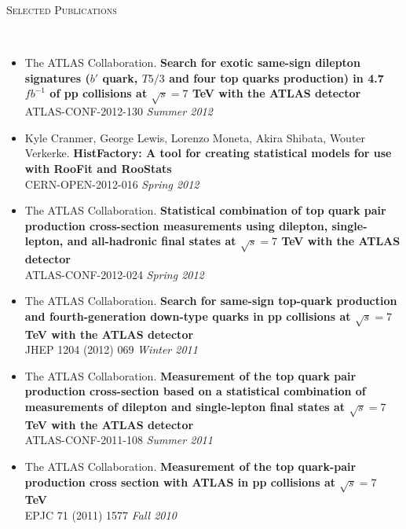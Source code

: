 \documentclass[9pt]{article}
\newenvironment{changemargin}[2]{%
  \begin{list}{}{%
    \setlength{\topsep}{0pt}%
    \setlength{\leftmargin}{#1}%
    \setlength{\rightmargin}{#2}%
    \setlength{\listparindent}{\parindent}%
    \setlength{\itemindent}{\parindent}%
    \setlength{\parsep}{\parskip}%
  }%
  \item[]}{\end{list}
}
\newcommand{\lineover}{
	\begin{changemargin}{-0.05in}{-0.05in}
		\vspace*{-8pt}
		\hrulefill \\
		\vspace*{-2pt}
	\end{changemargin}
}
\newcommand{\header}[1]{
	\begin{changemargin}{-0.5in}{-0.5in}
		\scshape{#1}\\
  	\lineover
	\end{changemargin}
}
\newenvironment{body} {
	\vspace*{-16pt}
	\begin{changemargin}{-0.25in}{-0.5in}
  }	
	{\end{changemargin}
}
\begin{document}
\smallskip


\clearpage
\newpage



\header{Selected Publications}

\begin{body}
  \vspace{14pt}
  \begin{itemize}
  \item The ATLAS Collaboration. \textbf{Search for exotic same-sign dilepton signatures ($b'$ quark, $T5/3$ and four top quarks production) in 4.7 $fb^{-1}$ of pp collisions at $\sqrt{s}=7$ TeV with the ATLAS detector} \\
    ATLAS-CONF-2012-130  \hfill \emph{Summer 2012} \\
    \medskip
  \item Kyle Cranmer, George Lewis, Lorenzo Moneta, Akira Shibata, Wouter Verkerke. \textbf{HistFactory: A tool for creating statistical models for use with RooFit and RooStats} \\
    CERN-OPEN-2012-016 \hfill \emph{Spring 2012} \\
    \medskip
  \item The ATLAS Collaboration.  \textbf{Statistical combination of top quark pair production cross-section measurements using dilepton, single-lepton, and all-hadronic final states at $\sqrt{s}=7$ TeV with the ATLAS detector} \\
    ATLAS-CONF-2012-024 \hfill \emph{Spring 2012} \\
    \medskip
  \item The ATLAS Collaboration. \textbf{Search for same-sign top-quark production and fourth-generation down-type quarks in pp collisions at $\sqrt{s}=7$ TeV with the ATLAS detector} \\ 
    JHEP 1204 (2012) 069 \hfill \emph{Winter 2011} \\
    \medskip
  \item The ATLAS Collaboration.  \textbf{Measurement of the top quark pair production cross-section based on a statistical combination of measurements of dilepton and single-lepton final states at $\sqrt{s}=7$ TeV with the ATLAS detector} \\
    ATLAS-CONF-2011-108 \hfill \emph{Summer 2011} \\
    \medskip
    \item The ATLAS Collaboration. \textbf{Measurement of the top quark-pair production cross section with ATLAS in pp collisions at $\sqrt{s}=7$ TeV} \\
      EPJC 71 (2011) 1577 \hfill \emph{Fall 2010} \\
  \end{itemize}
\end{body}
\end{document}
